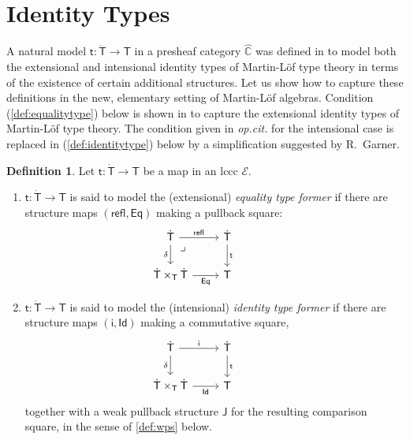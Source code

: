 \documentclass[12pt,reqno]{amsart}
\newcommand{\C}{\ensuremath{\mathbb{C}}}
\newcommand{\EE}{\ensuremath{\mathcal{E}}}
\renewcommand{\to}{\ensuremath{\rightarrow}}
\newcommand{\refl}{\mathsf{refl}}
\renewcommand{\t}{\ensuremath{\mathsf{t}}}
\newcommand{\tT}{\ensuremath{{\t}:\TT\to\T}}
\newcommand{\T}{\ensuremath{\mathsf{T}}}
\newcommand{\TT}{\ensuremath{\dot{\mathsf{T}}}}
\newcommand{\pbcorner}{\arrow[dr,phantom,"\lrcorner" very near start, shift right=.5ex]} %
\theoremstyle{remark}
\theoremstyle{definition}
\newtheorem{definition}[theorem]{Definition}
\begin{document}
\section{Identity Types}\label{sec:Eq and Id}

A natural model $\tT$ in a presheaf category $\widehat{\C}$ was defined in \cite{Awodey:NM} to model both the extensional and intensional identity types of Martin-L\"of type theory in terms of the existence of certain additional structures.  Let us show how to capture these definitions in the new, elementary setting of Martin-L\"of algebras.  Condition (\ref{def:equalitytype}) below is shown in \cite{Awodey:NM} to capture the extensional identity types of Martin-L\"of type theory.  The condition given in \emph{op.cit.} for the intensional case is replaced in (\ref{def:identitytype}) below by a simplification suggested by R.\ Garner.   

\begin{definition}\label{def:EqualityandIdentityTypes}
Let $\tT$ be a map in an lccc $\EE$. 
\begin{enumerate}
\item\label{def:equalitytype}  $\tT$ is said to  model the (extensional) \emph{equality type former} if there are structure maps $(\refl, \mathsf{Eq})$ making a pullback square:
\begin{equation*}\label{diag:Eqtypes}
\begin{tikzcd}
	\TT \ar[r,"\refl"] \ar[d,swap,"\delta"] \pbcorner &  \TT \ar[d, "\t"]\\  
	\TT \times_\T \TT \ar[r, swap,"\mathsf{Eq}"] & \T
 \end{tikzcd}\qquad \qquad 
 \end{equation*}
\item\label{def:identitytype}   $\tT$ is said to model the (intensional) \emph{identity type former} if there are structure maps $(\mathsf{i}, \mathsf{Id})$ making a commutative square,
\begin{equation}\label{diag:Idtypes}
\begin{tikzcd}
	\TT \ar[r,"\mathsf{i}"] \ar[d,swap,"\delta"] &  \TT \ar[d, "\t"]\\  
	\TT \times_\T \TT \ar[r, swap,"\mathsf{Id}"] & \T
 \end{tikzcd}\qquad \qquad 
 \end{equation}
 together with a weak pullback structure $\mathsf{J}$ for the resulting comparison square, in the sense of \eqref{def:wps} below. 
 \end{enumerate}
   \end{definition}
\end{document}
